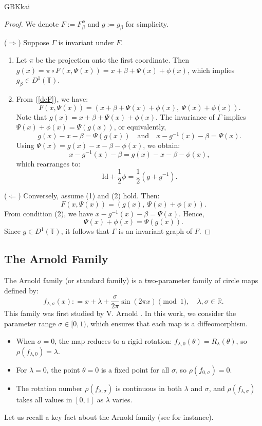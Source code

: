 \documentclass{amsart}
\newcommand{\T}{\mathbb{T}}
\theoremstyle{definition}
\begin{document}
\begin{CJK*}{GBK}{kai}
\begin{proof}We denote $F:=F_\beta^\phi$ and $g:=g_\beta$ for simplicity.

($\Rightarrow$) Suppose $\Gamma$ is invariant under $F$.
\begin{enumerate}
    \item[(1)] Let $\pi$ be the projection onto the first coordinate. Then $g(x) = \pi \circ F(x, \Psi(x)) = x + \beta + \Psi(x) + \phi(x)$, which implies $g_\beta\in D^1(\T)$.
    \item[(2)] From (\ref{deF}), we have:
    \[
    F(x, \Psi(x)) = (x + \beta + \Psi(x) + \phi(x),\ \Psi(x) + \phi(x)).
    \]
    Note that $g(x) = x + \beta + \Psi(x) + \phi(x)$. The invariance of $\Gamma$ implies $\Psi(x) + \phi(x) = \Psi(g(x))$, or equivalently,
    \[
    g(x) - x - \beta = \Psi(g(x)) \quad \text{and} \quad x - g^{-1}(x) - \beta = \Psi(x).
    \]
    Using $\Psi(x) = g(x) - x - \beta - \phi(x)$, we obtain:
    \[
    x - g^{-1}(x) - \beta = g(x) - x - \beta - \phi(x),
    \]
    which rearranges to:
    \[
    \mathrm{Id} + \frac{1}{2}{\phi} = \frac{1}{2}\left({g} + {g}^{-1}\right).
    \]
\end{enumerate}

($\Leftarrow$) Conversely, assume (1) and (2) hold. Then:
\[
F(x, \Psi(x)) = (g(x),\ \Psi(x) + \phi(x)).
\]
From condition (2), we have $x - g^{-1}(x) - \beta = \Psi(x)$. Hence,
\[
\Psi(x) + \phi(x) = \Psi(g(x)).
\]
Since $g\in D^1(\T)$, it follows that $\Gamma$ is an invariant graph of $F$.
\end{proof}

\vspace{1ex}

\subsection{The Arnold Family}\label{2.2}

The Arnold family (or standard family) is a two-parameter family of circle maps defined by:
\begin{equation}\label{arnf}
f_{\lambda, \sigma}(x): = x + \lambda + \frac{\sigma}{2\pi} \sin(2\pi x) \pmod{1}, \quad \lambda, \sigma \in \mathbb{R}.
\end{equation}
This family was first studied by V. Arnold \cite{Ar}. In this work, we consider the parameter range $\sigma \in [0,1)$, which ensures that each map is a diffeomorphism.

\begin{itemize}
\item When $\sigma = 0$, the map reduces to a rigid rotation: $f_{\lambda,0}(\theta) = R_\lambda(\theta)$, so $\rho(f_{\lambda,0}) = \lambda$.
\item For $\lambda = 0$, the point $\theta = 0$ is a fixed point for all $\sigma$, so $\rho(f_{0,\sigma}) = 0$.
\item The rotation number $\rho(f_{\lambda,\sigma})$ is continuous in both $\lambda$ and $\sigma$, and  $\rho(f_{\lambda,\sigma})$ takes all values in $[0,1]$ as $\lambda$ varies.
    \end{itemize}
 Let us recall a key fact about the Arnold family (see \cite[Chapter I, Lemma 4.2]{de} for instance).


\end{CJK*}
\end{document}
